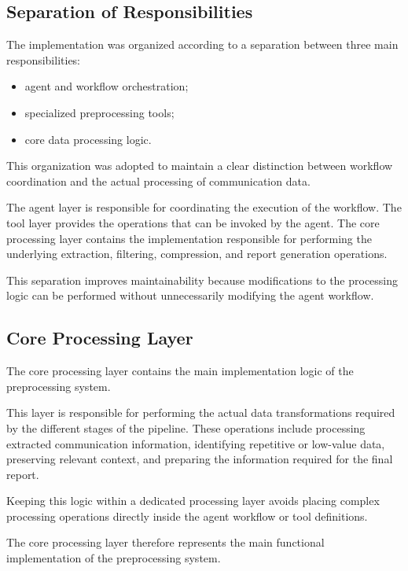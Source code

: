 \subsection{Separation of Responsibilities}

The implementation was organized according to a separation between three main responsibilities:

\begin{itemize}
    \item agent and workflow orchestration;
    \item specialized preprocessing tools;
    \item core data processing logic.
\end{itemize}

This organization was adopted to maintain a clear distinction between workflow coordination and the actual processing of communication data.

The agent layer is responsible for coordinating the execution of the workflow. The tool layer provides the operations that can be invoked by the agent. The core processing layer contains the implementation responsible for performing the underlying extraction, filtering, compression, and report generation operations.

This separation improves maintainability because modifications to the processing logic can be performed without unnecessarily modifying the agent workflow.

\subsection{Core Processing Layer}

The core processing layer contains the main implementation logic of the preprocessing system.

This layer is responsible for performing the actual data transformations required by the different stages of the pipeline. These operations include processing extracted communication information, identifying repetitive or low-value data, preserving relevant context, and preparing the information required for the final report.

Keeping this logic within a dedicated processing layer avoids placing complex processing operations directly inside the agent workflow or tool definitions.

The core processing layer therefore represents the main functional implementation of the preprocessing system.

